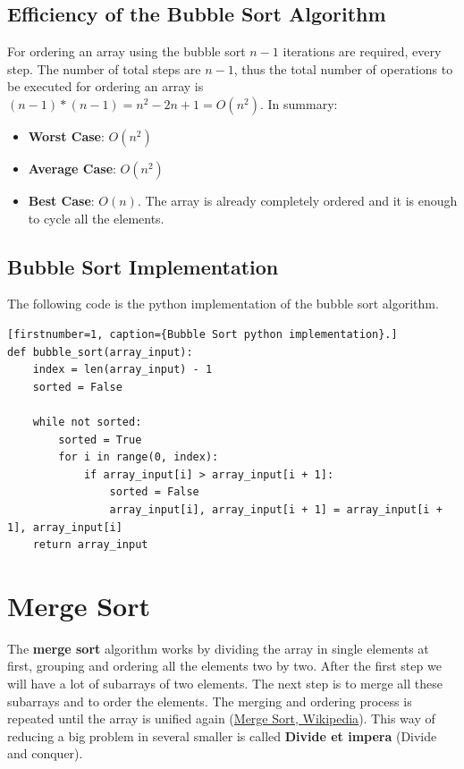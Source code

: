 \subsection{Efficiency of the Bubble Sort Algorithm}
For ordering an array using the bubble sort \(n - 1\) iterations are required, every step. The number of total steps are \(n - 1\), thus the total number of operations to be executed for ordering an array is \((n - 1)*(n - 1) = n^{2} - 2n + 1 = O(n^{2})\).
In summary:
\begin{itemize}
\item \textbf{Worst Case}: \(O(n^{2})\)
\item \textbf{Average Case}: \(O(n^{2})\)
\item \textbf{Best Case}: \(O(n)\). The array is already completely ordered and it is enough to cycle all the elements.
\end{itemize} 

\subsection{Bubble Sort Implementation}
The following code is the python implementation of the bubble sort algorithm.
\begin{lstlisting}[firstnumber=1, caption={Bubble Sort python implementation}.]
def bubble_sort(array_input):
	index = len(array_input) - 1
	sorted = False
	
	while not sorted:
		sorted = True
		for i in range(0, index):
			if array_input[i] > array_input[i + 1]:
				sorted = False
				array_input[i], array_input[i + 1] = array_input[i + 1], array_input[i]
	return array_input
\end{lstlisting}

\section{Merge Sort}
The \textbf{merge sort} algorithm works by dividing the array in single elements at first, grouping and ordering all the elements two by two. After the first step we will have a lot of subarrays of two elements. The next step is to merge all these subarrays and to order the elements. The merging and ordering process is repeated until the array is unified again \cite{wikimergesort} (\href{https://en.wikipedia.org/wiki/Merge_sort}{Merge Sort, Wikipedia}).  This way of reducing a big problem in several smaller is called \textbf{Divide et impera} (Divide and conquer).

